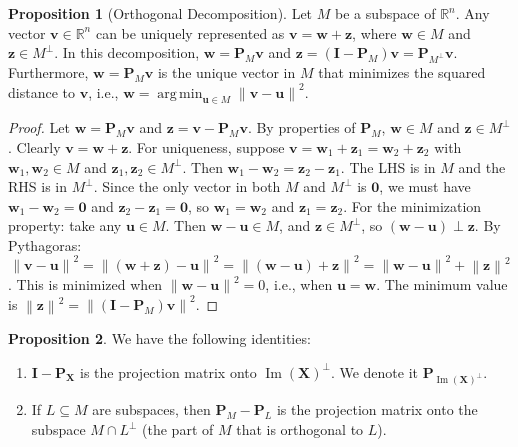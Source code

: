 \documentclass[11pt, letterpaper]{article}
\theoremstyle{definition}
\newtheorem{proposition}{Proposition}[section]
\newcommand{\R}{\mathbb{R}}
\newcommand{\norm}[1]{\left\lVert#1\right\rVert}
\newcommand{\mat}[1]{\mathbf{#1}} %
\newcommand{\vect}[1]{\mathbf{#1}} %
\DeclareMathOperator{\im}{Im}       %
\DeclareMathOperator{\argmin}{arg\,min} %
\begin{document}
\begin{proposition}[Orthogonal Decomposition]
Let $M$ be a subspace of $\R^n$. Any vector $\vect{v} \in \R^n$ can be uniquely represented as $\vect{v} = \vect{w} + \vect{z}$, where $\vect{w} \in M$ and $\vect{z} \in M^{\perp}$. In this decomposition, $\vect{w} = \mat{P}_M \vect{v}$ and $\vect{z} = (\mat{I} - \mat{P}_M)\vect{v} = \mat{P}_{M^{\perp}}\vect{v}$. Furthermore, $\vect{w} = \mat{P}_M \vect{v}$ is the unique vector in $M$ that minimizes the squared distance to $\vect{v}$, i.e., $\vect{w} = \argmin_{\vect{u} \in M} \norm{\vect{v}-\vect{u}}^2$.
\end{proposition}
\begin{proof}
Let $\vect{w} = \mat{P}_M \vect{v}$ and $\vect{z} = \vect{v} - \mat{P}_M \vect{v}$. By properties of $\mat{P}_M$, $\vect{w} \in M$ and $\vect{z} \in M^{\perp}$. Clearly $\vect{v} = \vect{w}+\vect{z}$. For uniqueness, suppose $\vect{v} = \vect{w}_1 + \vect{z}_1 = \vect{w}_2 + \vect{z}_2$ with $\vect{w}_1, \vect{w}_2 \in M$ and $\vect{z}_1, \vect{z}_2 \in M^{\perp}$. Then $\vect{w}_1 - \vect{w}_2 = \vect{z}_2 - \vect{z}_1$. The LHS is in $M$ and the RHS is in $M^{\perp}$. Since the only vector in both $M$ and $M^{\perp}$ is $\vect{0}$, we must have $\vect{w}_1 - \vect{w}_2 = \vect{0}$ and $\vect{z}_2 - \vect{z}_1 = \vect{0}$, so $\vect{w}_1=\vect{w}_2$ and $\vect{z}_1=\vect{z}_2$.
For the minimization property: take any $\vect{u} \in M$. Then $\vect{w}-\vect{u} \in M$, and $\vect{z} \in M^{\perp}$, so $(\vect{w}-\vect{u}) \perp \vect{z}$. By Pythagoras:
\[
\norm{\vect{v}-\vect{u}}^2 = \norm{(\vect{w}+\vect{z})-\vect{u}}^2 = \norm{(\vect{w}-\vect{u}) + \vect{z}}^2 = \norm{\vect{w}-\vect{u}}^2 + \norm{\vect{z}}^2
\]. This is minimized when $\norm{\vect{w}-\vect{u}}^2 = 0$, i.e., when $\vect{u}=\vect{w}$. The minimum value is $\norm{\vect{z}}^2 = \norm{(\mat{I}-\mat{P}_M)\vect{v}}^2$.
\end{proof}

\begin{proposition} We have the following identities:
\begin{enumerate}
    \item $\mat{I} - \mat{P}_{\mat{X}}$ is the projection matrix onto $\im(\mat{X})^{\perp}$. We denote it $\mat{P}_{\im(\mat{X})^{\perp}}$.
    \item If $L \subseteq M$ are subspaces, then $\mat{P}_M - \mat{P}_L$ is the projection matrix onto the subspace $M \cap L^{\perp}$ (the part of $M$ that is orthogonal to $L$).
\end{enumerate}
\end{proposition}
\end{document}

